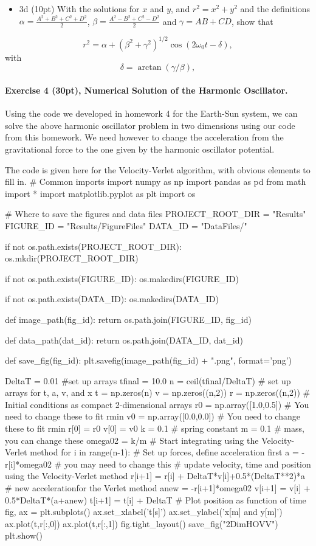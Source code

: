\documentclass[%
oneside,                 %
final,                   %
10pt]{article}
\begin{document}
\begin{itemize}
\item 3d (10pt) With the solutions for $x$ and $y$, and $r^2=x^2+y^2$ and the definitions $\alpha=\frac{A^2+B^2+C^2+D^2}{2}$, $\beta=\frac{A^2-B^2+C^2-D^2}{2}$ and $\gamma=AB+CD$, show that
\end{itemize}

\noindent
\[
r^2=\alpha+(\beta^2+\gamma^2)^{1/2}\cos(2\omega_0 t-\delta),
\]
with
\[
\delta=\arctan(\gamma/\beta),
\]


\paragraph{Exercise 4 (30pt), Numerical Solution of the Harmonic Oscillator.}
Using the code we developed in homework 4 for the Earth-Sun system, we can solve the above harmonic oscillator problem in two dimensions using our code from this homework. We need however to change the acceleration from the gravitational force to the one given by the harmonic oscillator potential.

The code is given here for the Velocity-Verlet algorithm, with obvious elements to fill in. 
\bpycod
# Common imports
import numpy as np
import pandas as pd
from math import *
import matplotlib.pyplot as plt
import os

# Where to save the figures and data files
PROJECT_ROOT_DIR = "Results"
FIGURE_ID = "Results/FigureFiles"
DATA_ID = "DataFiles/"

if not os.path.exists(PROJECT_ROOT_DIR):
    os.mkdir(PROJECT_ROOT_DIR)

if not os.path.exists(FIGURE_ID):
    os.makedirs(FIGURE_ID)

if not os.path.exists(DATA_ID):
    os.makedirs(DATA_ID)

def image_path(fig_id):
    return os.path.join(FIGURE_ID, fig_id)

def data_path(dat_id):
    return os.path.join(DATA_ID, dat_id)

def save_fig(fig_id):
    plt.savefig(image_path(fig_id) + ".png", format='png')

DeltaT = 0.01
#set up arrays 
tfinal = 10.0
n = ceil(tfinal/DeltaT)
# set up arrays for t, a, v, and x
t = np.zeros(n)
v = np.zeros((n,2))
r = np.zeros((n,2))
# Initial conditions as compact 2-dimensional arrays
r0 = np.array([1.0,0.5])  # You need to  change these to fit rmin
v0 = np.array([0.0,0.0]) # You need to change these to fit rmin
r[0] = r0
v[0] = v0
k = 0.1   # spring constant
m = 0.1   # mass, you can change these
omega02 = k/m
# Start integrating using the Velocity-Verlet  method
for i in range(n-1):
    # Set up forces, define acceleration first
    a =  -r[i]*omega02  # you may need to change this
    # update velocity, time and position using the Velocity-Verlet method
    r[i+1] = r[i] + DeltaT*v[i]+0.5*(DeltaT**2)*a
    # new accelerationfor the Verlet method
    anew = -r[i+1]*omega02  
    v[i+1] = v[i] + 0.5*DeltaT*(a+anew)
    t[i+1] = t[i] + DeltaT
# Plot position as function of time    
fig, ax = plt.subplots()
ax.set_xlabel('t[s]')
ax.set_ylabel('x[m] and y[m]')
ax.plot(t,r[:,0])
ax.plot(t,r[:,1])
fig.tight_layout()
save_fig("2DimHOVV")
plt.show()
\end{document}

